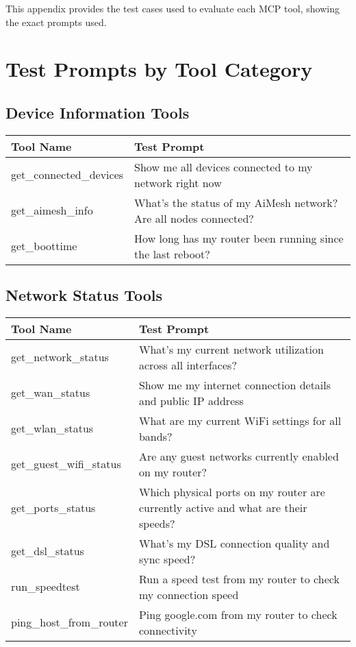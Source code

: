 This appendix provides the test cases used to evaluate each MCP tool, showing the exact prompts used.

\section*{Test Prompts by Tool Category}
{\small
\subsection*{Device Information Tools}
\begin{tabular}{|p{6cm}|p{9cm}|}
\hline
\textbf{Tool Name} & \textbf{Test Prompt} \\
\hline
get\_connected\_devices & Show me all devices connected to my network right now \\
\hline
get\_aimesh\_info & What's the status of my AiMesh network? Are all nodes connected? \\
\hline
get\_boottime & How long has my router been running since the last reboot? \\
\hline
\end{tabular}

\subsection*{Network Status Tools}
\begin{tabular}{|p{6cm}|p{9cm}|}
\hline
\textbf{Tool Name} & \textbf{Test Prompt} \\
\hline
get\_network\_status & What's my current network utilization across all interfaces? \\
\hline
get\_wan\_status & Show me my internet connection details and public IP address \\
\hline
get\_wlan\_status & What are my current WiFi settings for all bands? \\
\hline
get\_guest\_wifi\_status & Are any guest networks currently enabled on my router? \\
\hline
get\_ports\_status & Which physical ports on my router are currently active and what are their speeds? \\
\hline
get\_dsl\_status & What's my DSL connection quality and sync speed? \\
\hline
run\_speedtest & Run a speed test from my router to check my connection speed \\
\hline
ping\_host\_from\_router & Ping google.com from my router to check connectivity \\
\hline
\end{tabular}

}
